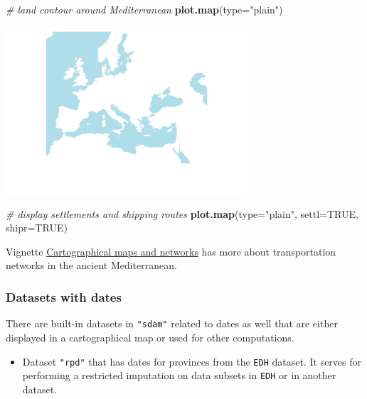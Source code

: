 \documentclass[a4paper,11pt]{memoir}
\newenvironment{Shaded}{\begin{snugshade}}{\end{snugshade}}
\newcommand{\CommentTok}[1]{\textcolor[rgb]{0.56,0.35,0.01}{\textit{#1}}}
\newcommand{\DataTypeTok}[1]{\textcolor[rgb]{0.13,0.29,0.53}{#1}}
\newcommand{\KeywordTok}[1]{\textcolor[rgb]{0.13,0.29,0.53}{\textbf{#1}}}
\newcommand{\NormalTok}[1]{#1}
\newcommand{\OtherTok}[1]{\textcolor[rgb]{0.56,0.35,0.01}{#1}}
\newcommand{\StringTok}[1]{\textcolor[rgb]{0.31,0.60,0.02}{#1}}
\providecommand{\tightlist}{%
  \setlength{\itemsep}{0pt}\setlength{\parskip}{0pt}}
\begin{document}
\begin{Shaded}
\begin{Highlighting}[]
\CommentTok{# land contour around Mediterranean}
\KeywordTok{plot.map}\NormalTok{(}\DataTypeTok{type=}\StringTok{"plain"}\NormalTok{)}
\end{Highlighting}
\end{Shaded}

{\centering
\includegraphics[width=9cm, trim=0 0 0 0, clip]{img/unnamed-chunk-18-1} 
}

\begin{Shaded}
\begin{Highlighting}[]
\CommentTok{# display settlements and shipping routes}
\KeywordTok{plot.map}\NormalTok{(}\DataTypeTok{type=}\StringTok{"plain"}\NormalTok{, }\DataTypeTok{settl=}\OtherTok{TRUE}\NormalTok{, }\DataTypeTok{shipr=}\OtherTok{TRUE}\NormalTok{)}
\end{Highlighting}
\end{Shaded}

Vignette \href{../doc/Maps.html}{Cartographical maps and networks} has
more about transportation networks in the ancient Mediterranean.

\hypertarget{datasets-with-dates}{%
\subsubsection{Datasets with dates}\label{datasets-with-dates}}

There are built-in datasets in \texttt{"sdam"} related to dates as well
that are either displayed in a cartographical map or used for other
computations.

\begin{itemize}
\tightlist
\item
  Dataset \texttt{"rpd"} that has dates for provinces from the
  \texttt{EDH} dataset. It serves for performing a restricted imputation
  on data subsets in \texttt{EDH} or in another dataset.
\end{itemize}
\end{document}
